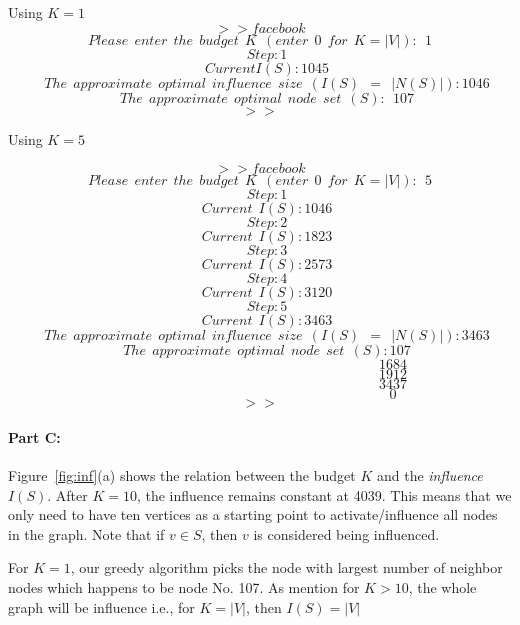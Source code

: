 Using  $K = 1$
$$
>> facebook
$$
$$
Please\ \ enter\ \ the\ \ budget\ \ K\ \ (enter\ \ 0\ \ for\ \ K=|V|):\ \ 1
$$
$$
\quad Step: 1
$$
$$
\quad Current I(S):1045
$$
$$
\quad The\ \ approximate\ \ optimal\ \ influence\ \ size\ \ (I(S)\ \ =\ \ |N(S)|): 1046
$$
$$
\quad The\ \ approximate\ \ optimal\ \ node\ \ set\ \ (S):\ \ 107
$$
$$
>>
$$

Using  $K = 5$

$$
>> facebook
$$
$$
Please\ \ enter\ \ the\ \ budget\ \ K\ \ (enter\ \ 0\ \ for\ \ K=|V|):\ \ 5
$$
$$
\quad Step: 1
$$
$$
\quad Current\ \ I(S):1046
$$
$$
\quad Step: 2
$$
$$
\quad Current\ \ I(S):1823
$$
$$
\quad Step: 3
$$
$$
\quad Current\ \ I(S):2573
$$
$$
\quad Step: 4
$$
$$
\quad Current\ \ I(S):3120
$$
$$
\quad Step: 5
$$
$$
\quad Current\ \ I(S):3463
$$
$$
\quad The\ \ approximate\ \ optimal\ \ influence\ \ size\ \ (I(S)\ \ =\ \ |N(S)|): 3463
$$
$$
\quad The\ \ approximate\ \ optimal\ \ node\ \ set\ \ (S): 107
$$
$$
\qquad \qquad \qquad \qquad \qquad \qquad \qquad \qquad \qquad \quad 1684
$$
$$
\qquad \qquad \qquad \qquad \qquad \qquad \qquad \qquad \qquad \quad 1912
$$
$$
\qquad \qquad \qquad \qquad \qquad \qquad \qquad \qquad \qquad \quad 3437
$$
$$
\qquad \qquad \qquad \qquad \qquad \qquad \qquad \qquad \qquad \quad 0
$$
$$
>>
$$
 



\paragraph{Part C:}
Figure~\ref{fig:inf}(a) shows the relation between the budget $K$ and the \emph{influence} $I(S)$. After $K=10$, the influence remains constant at 4039. This means that we only need to have ten vertices as a starting point to activate/influence all nodes in the graph. Note that if $v\in S$, then $v$ is considered being influenced. 

For $K=1$, our greedy algorithm picks the node with largest number of neighbor nodes which happens to be node No. 107. As mention for $K>10$, the whole graph will be influence i.e., for $K=|V|$, then $I(S) = |V|$

